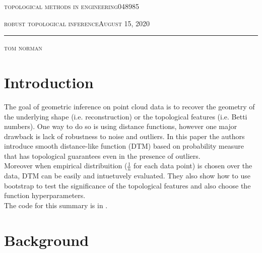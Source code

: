 \documentclass[11pt]{article}
\theoremstyle{definition}
\theoremstyle{definition}
\def \lecturedate {August 15, 2020}
\begin{document}
\noindent
\begin{minipage}[t]{1\columnwidth}%
\textsc{topological methods in engineering}\hspace*{\fill}048985
\vspace{2mm}

\textsc{\LARGE robust topological inference}\hspace*{\fill}\textsc{\lecturedate}

\noindent \rule[0.5ex]{1\linewidth}{1pt}

\textsc{tom norman}
\vspace{10mm}
\end{minipage}



\newcommand {\image}[5] {
    \begin{figure}
        \begin{center}
		\texttt{[image: imgs/\#1]}
		\caption{#2}
		\label{#5}
        \end{center}
    \end{figure}
}


\section{Introduction}
	The goal of geometric inference on point cloud data is to recover the geometry of the underlying shape (i.e. reconstruction) or the topological features (i.e. Betti numbers).
	One way to do so is using distance functions, however one major drawback is lack of robustness to noise and outliers.
	In  this paper the authors introduce smooth distance-like function (DTM) based on probability measure that has topological guarantees even in the presence of outliers.\\
	Moreover when empirical distribuition ($\frac{1}{n}$ for each data point) is chosen over the data, DTM can be easily and intuetuvely evaluated.
	They also show how to use bootstrap to test the significance of the topological features and also choose the function hyperparameters.\\
	The code for this summary is in \cite{git}.
\section{Background}
\end{document}
